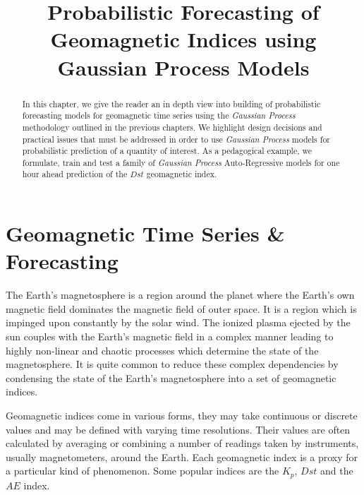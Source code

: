 \documentclass{article}
\title{Probabilistic Forecasting of Geomagnetic Indices using Gaussian Process Models}
\begin{document}
\begin{abstract}

In this chapter, we give the reader an in depth view into building of probabilistic forecasting models for geomagnetic time series using the \emph{Gaussian Process} methodology outlined in the previous chapters. We highlight design decisions and practical issues that must be addressed in order to use \emph{Gaussian Process} models for probabilistic prediction of a quantity of interest. As a pedagogical example, we formulate, train and test a family of \emph{Gaussian Process} Auto-Regressive models for one hour ahead prediction of the $Dst$ geomagnetic index.  

\end{abstract}

\section{Geomagnetic Time Series \& Forecasting}

The Earth's magnetosphere is a region around the planet where the Earth's own magnetic field dominates the magnetic field of outer space. It is a region which is impinged upon constantly by the solar wind. The ionized plasma ejected by the sun couples with the Earth's magnetic field in a complex manner leading to highly non-linear and chaotic processes which determine the state of the magnetosphere. It is quite common to reduce these complex dependencies by condensing the state of the Earth's magnetosphere into a set of geomagnetic indices.

Geomagnetic indices come in various forms, they may take continuous or discrete values and may be defined with varying time resolutions. Their values are often calculated by averaging or combining a number of readings taken by instruments, usually magnetometers, around the Earth. Each geomagnetic index is a proxy for a particular kind of phenomenon. Some popular indices are the $K_p$, $Dst$ and the $AE$ index.
\end{document}
